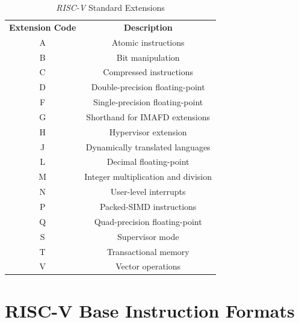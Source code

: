 \begin{table}
  \centering
  \begin{tabular}{|c|c|}
    \hline
    \textbf{Extension Code} & \textbf{Description}                \\
    \hhline{==} A           & Atomic instructions                 \\
    \hline
    B                       & Bit manipulation                    \\
    \hline
    C                       & Compressed instructions             \\
    \hline
    D                       & Double-precision floating-point     \\
    \hline
    F                       & Single-precision floating-point     \\
    \hline
    G                       & Shorthand for IMAFD extensions      \\
    \hline
    H                       & Hypervisor extension                \\
    \hline
    J                       & Dynamically translated languages    \\
    \hline
    L                       & Decimal floating-point              \\
    \hline
    M                       & Integer multiplication and division \\
    \hline
    N                       & User-level interrupts               \\
    \hline
    P                       & Packed-SIMD instructions            \\
    \hline
    Q                       & Quad-precision floating-point       \\
    \hline
    S                       & Supervisor mode                     \\
    \hline
    T                       & Transactional memory                \\
    \hline
    V                       & Vector operations                   \\
    \hline
  \end{tabular}
  \caption{\textit{RISC-V} Standard Extensions}
  \label{tab:extensions}
\end{table}

\section{RISC-V Base Instruction Formats}
\label{sec:riscv_bif}

